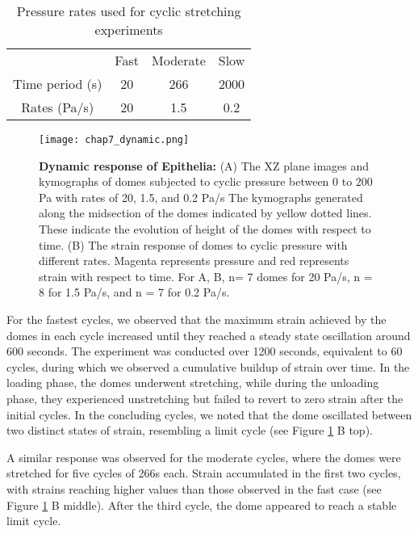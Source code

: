 \begin{center}
	\begin{table}[h!]
		\label{tab:hysteresis}
		\centering
		\begin{tabular}{c c c c}
			& Fast & Moderate & Slow \\ 
			Time period (s) & 20   & 266      & 2000 \\ 
			Rates (Pa/s)    & 20   & 1.5      & 0.2  \\ 
		\end{tabular}
		\caption{Pressure rates used for cyclic stretching experiments}
	\end{table}
\end{center}



\begin{figure}[h!]
	\centering
	\texttt{[image: chap7\_dynamic.png]}
	\caption{\label{fig_7_6} \textbf{Dynamic response of Epithelia:} (A) The XZ plane images and kymographs of domes subjected to cyclic pressure between 0 to 200 Pa with rates of 20, 1.5, and 0.2 Pa/s The kymographs generated along the midsection of the domes indicated by yellow dotted lines. These indicate the evolution of height of the domes with respect to time. (B) The strain response of domes to cyclic pressure with different rates. Magenta represents pressure and red represents strain with respect to time. For A, B, n= 7 domes for 20 Pa/s, n = 8 for 1.5 Pa/s, and n = 7 for 0.2 Pa/s. 
	}
\end{figure}

For the fastest cycles, we observed that the maximum strain achieved by the domes in each cycle increased until they reached a steady state oscillation around 600 seconds. 
The experiment was conducted over 1200 seconds, equivalent to 60 cycles, during which we observed a cumulative buildup of strain over time. In the loading phase, the domes underwent stretching, while during the unloading phase, they experienced unstretching but failed to revert to zero strain after the initial cycles. In the concluding cycles, we noted that the dome oscillated between two distinct states of strain, resembling a limit cycle (see Figure \ref{fig_7_6} B top).

A similar response was observed for the moderate cycles, where the domes were stretched for five cycles of 266s each. Strain accumulated in the first two cycles, with strains reaching higher values than those observed in the fast case (see Figure \ref{fig_7_6} B middle). After the third cycle, the dome appeared to reach a stable limit cycle.

